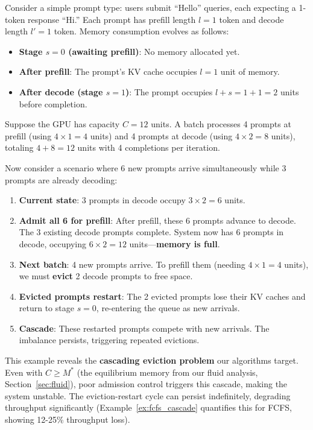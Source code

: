 \begin{example}
\label{ex:memory_growth}
Consider a simple prompt type: users submit ``Hello'' queries, each expecting a 1-token response ``Hi.'' Each prompt has prefill length $l=1$ token and decode length $l'=1$ token. Memory consumption evolves as follows:
\begin{itemize}
    \item \textbf{Stage $s=0$ (awaiting prefill)}: No memory allocated yet.
    \item \textbf{After prefill}: The prompt's KV cache occupies $l=1$ unit of memory.
    \item \textbf{After decode (stage $s=1$)}: The prompt occupies $l+s = 1+1 = 2$ units before completion.
\end{itemize}

Suppose the GPU has capacity $C=12$ units. A batch processes 4 prompts at prefill (using $4 \times 1 = 4$ units) and 4 prompts at decode (using $4 \times 2 = 8$ units), totaling $4+8=12$ units with 4 completions per iteration.

Now consider a scenario where 6 new prompts arrive simultaneously while 3 prompts are already decoding:
\begin{enumerate}
    \item \textbf{Current state}: 3 prompts in decode occupy $3 \times 2 = 6$ units.
    \item \textbf{Admit all 6 for prefill}: After prefill, these 6 prompts advance to decode. The 3 existing decode prompts complete. System now has 6 prompts in decode, occupying $6 \times 2 = 12$ units---\textbf{memory is full}.
    \item \textbf{Next batch}: 4 new prompts arrive. To prefill them (needing $4 \times 1 = 4$ units), we must \textbf{evict} 2 decode prompts to free space.
    \item \textbf{Evicted prompts restart}: The 2 evicted prompts lose their KV caches and return to stage $s=0$, re-entering the queue as new arrivals.
    \item \textbf{Cascade}: These restarted prompts compete with new arrivals. The imbalance persists, triggering repeated evictions.
\end{enumerate}

This example reveals the \textbf{cascading eviction problem} our algorithms target. Even with $C \geq M^*$ (the equilibrium memory from our fluid analysis, Section~\ref{sec:fluid}), poor admission control triggers this cascade, making the system unstable. The eviction-restart cycle can persist indefinitely, degrading throughput significantly (Example~\ref{ex:fcfs_cascade} quantifies this for FCFS, showing 12-25\% throughput loss).
\end{example}

